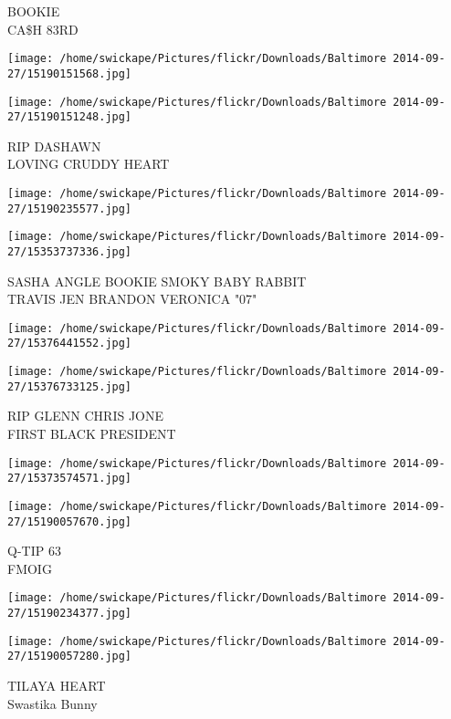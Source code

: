 \documentclass[10pt,letterpaper]{article}
\begin{document}
BOOKIE\\
CA\$H 83RD
\pagebreak

\texttt{[image: /home/swickape/Pictures/flickr/Downloads/Baltimore 2014-09-27/15190151568.jpg]}

\vspace{0.25in}
\texttt{[image: /home/swickape/Pictures/flickr/Downloads/Baltimore 2014-09-27/15190151248.jpg]}

RIP DASHAWN\\
LOVING CRUDDY HEART
\pagebreak

\texttt{[image: /home/swickape/Pictures/flickr/Downloads/Baltimore 2014-09-27/15190235577.jpg]}

\vspace{0.25in}
\texttt{[image: /home/swickape/Pictures/flickr/Downloads/Baltimore 2014-09-27/15353737336.jpg]}

SASHA ANGLE BOOKIE SMOKY BABY RABBIT\\
TRAVIS JEN BRANDON VERONICA "07"
\pagebreak

\texttt{[image: /home/swickape/Pictures/flickr/Downloads/Baltimore 2014-09-27/15376441552.jpg]}

\vspace{0.25in}
\texttt{[image: /home/swickape/Pictures/flickr/Downloads/Baltimore 2014-09-27/15376733125.jpg]}

RIP GLENN CHRIS JONE\\
FIRST BLACK PRESIDENT
\pagebreak

\texttt{[image: /home/swickape/Pictures/flickr/Downloads/Baltimore 2014-09-27/15373574571.jpg]}

\vspace{0.25in}
\texttt{[image: /home/swickape/Pictures/flickr/Downloads/Baltimore 2014-09-27/15190057670.jpg]}

Q{-}TIP 63\\
FMOIG
\pagebreak

\texttt{[image: /home/swickape/Pictures/flickr/Downloads/Baltimore 2014-09-27/15190234377.jpg]}

\vspace{0.25in}
\texttt{[image: /home/swickape/Pictures/flickr/Downloads/Baltimore 2014-09-27/15190057280.jpg]}

TILAYA HEART\\
Swastika Bunny
\pagebreak
\end{document}

